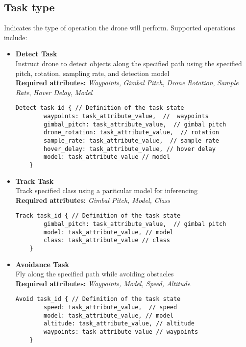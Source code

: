 \subsection {Task type}
\label{sec:task_type}
Indicates the type of operation the drone will perform. Supported operations include: 
\begin{itemize}
    \item \textbf{Detect Task}\\
    Instruct drone to detect objects along the specified path using the specified pitch, rotation, sampling rate, and detection model\\
    \textbf{Required attributes:} \textit{Waypoints}, \textit{Gimbal Pitch}, \textit{Drone} \textit{Rotation}, \textit{Sample} \textit{Rate}, \textit{Hover} \textit{Delay}, \textit{Model}
    \begin{lstlisting}[style=customgo] 
    Detect task_id { // Definition of the task state
        waypoints: task_attribute_value,  //  waypoints
        gimbal_pitch: task_attribute_value,  // gimbal pitch
        drone_rotation: task_attribute_value,  // rotation
        sample_rate: task_attribute_value,  // sample rate  
        hover_delay: task_attribute_value, // hover delay
        model: task_attribute_value // model
    }
    \end{lstlisting}  
    
    \item \textbf{Track Task} \\
    Track specified class using a paritcular model for inferencing \\
    \textbf{Required attributes:} \textit{Gimbal Pitch, Model, Class}
    \begin{lstlisting}[style=customgo] 
    Track task_id { // Definition of the task state
        gimbal_pitch: task_attribute_value,  // gimbal pitch
        model: task_attribute_value, // model
        class: task_attribute_value // class
    }
    \end{lstlisting}  

    \item \textbf{Avoidance Task} \\
    Fly along the specified path while avoiding obstacles\\
    \textbf{Required attributes:} \textit{Waypoints, Model, Speed, Altitude}
    \begin{lstlisting}[style=customgo] 
    Avoid task_id { // Definition of the task state
        speed: task_attribute_value,  // speed
        model: task_attribute_value, // model
        altitude: task_attribute_value, // altitude
        waypoints: task_attribute_value // waypoints
    }
    \end{lstlisting}  
\end{itemize}

